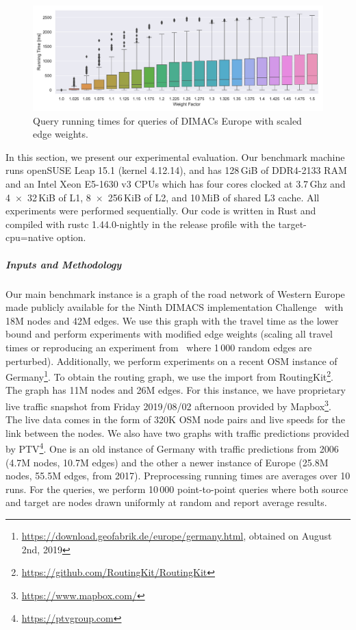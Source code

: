\documentclass[a4paper,UKenglish,cleveref, autoref]{lipics-v2019}
\begin{document}
\label{sec:experiments}

\begin{figure}
\centering
\includegraphics[width=\textwidth]{fig/scaled_weights.pdf}
\caption{Query running times for queries of DIMACs Europe with scaled edge weights.}\label{fig:scaled_weights}
\end{figure}

In this section, we present our experimental evaluation.
Our benchmark machine runs openSUSE Leap 15.1 (kernel 4.12.14), and has 128\,GiB of DDR4-2133 RAM and an Intel Xeon E5-1630 v3 CPUs which has four cores clocked at 3.7\,Ghz and 4~$\times$~32\,KiB of L1, 8~$\times$~256\,KiB of L2, and 10\,MiB of shared L3 cache.
All experiments were performed sequentially.
Our code is written in Rust and compiled with rustc 1.44.0-nightly in the release profile with the target-cpu=native option.

\subparagraph{Inputs and Methodology}
Our main benchmark instance is a graph of the road network of Western Europe made publicly available for the Ninth DIMACS implementation Challenge~\cite{DemetrescuGJ09} with 18M nodes and 42M edges.
We use this graph with the travel time as the lower bound and perform experiments with modified edge weights (scaling all travel times or reproducing an experiment from~\cite{dw-lbrdg-07} where 1\,000 random edges are perturbed).
Additionally, we perform experiments on a recent OSM instance of Germany\footnote{\url{https://download.geofabrik.de/europe/germany.html}, obtained on August 2nd, 2019}.
To obtain the routing graph, we use the import from RoutingKit\footnote{\url{https://github.com/RoutingKit/RoutingKit}}.
The graph has 11M nodes and 26M edges.
For this instance, we have proprietary live traffic snapshot from Friday 2019/08/02 afternoon provided by Mapbox\footnote{\url{https://www.mapbox.com/}}.
The live data comes in the form of 320K OSM node pairs and live speeds for the link between the nodes.
We also have two graphs with traffic predictions provided by PTV\footnote{\url{https://ptvgroup.com}}.
One is an old instance of Germany with traffic predictions from 2006 (4.7M nodes, 10.7M edges) and the other a newer instance of Europe (25.8M nodes, 55.5M edges, from 2017).
Preprocessing running times are averages over 10 runs.
For the queries, we perform 10\,000 point-to-point queries where both source and target are nodes drawn uniformly at random and report average results.
\end{document}
